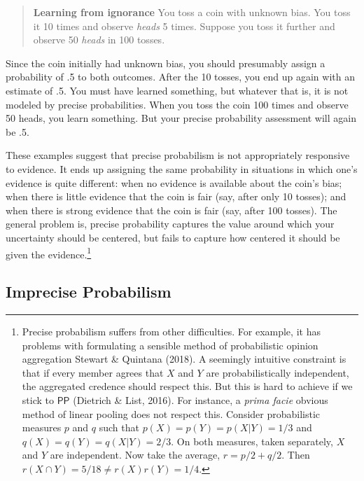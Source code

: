 \documentclass[
  10pt,
  dvipsnames,enabledeprecatedfontcommands]{scrartcl}
\newcommand{\s}[1]{\mbox{$\mathsf{#1}$}}
\begin{document}
\begin{quote}
\textbf{Learning from ignorance}
You toss a coin with unknown bias. You toss it 10 times and observe \emph{heads} 5 times. Suppose you toss it further and observe 50 \emph{heads} in 100 tosses. 
\end{quote}

\noindent Since the coin initially had unknown bias, you should
presumably assign a probability of .5 to both outcomes. After the 10
tosses, you end up again with an estimate of .5. You must have learned
something, but whatever that is, it is not modeled by precise
probabilities. When you toss the coin 100 times and observe 50 heads,
you learn something. But your precise probability assessment will again
be .5.

These examples suggest that precise probabilism is not appropriately
responsive to evidence. It ends up assigning the same probability in
situations in which one's evidence is quite different: when no evidence
is available about the coin's bias; when there is little evidence that
the coin is fair (say, after only 10 tosses); and when there is strong
evidence that the coin is fair (say, after 100 tosses). The general
problem is, precise probability captures the value around which your
uncertainty should be centered, but fails to capture how centered it
should be given the evidence.\footnote{Precise probabilism suffers from
  other difficulties. For example, it has problems with formulating a
  sensible method of probabilistic opinion aggregation Stewart \&
  Quintana (2018). A seemingly intuitive constraint is that if every
  member agrees that \(X\) and \(Y\) are probabilistically independent,
  the aggregated credence should respect this. But this is hard to
  achieve if we stick to \s{PP} (Dietrich \& List, 2016). For instance,
  a \emph{prima facie} obvious method of linear pooling does not respect
  this. Consider probabilistic measures \(p\) and \(q\) such that
  \(p(X) = p(Y) = p(X\vert Y) = 1/3\) and
  \(q(X) = q(Y) = q(X\vert Y) = 2/3\). On both measures, taken
  separately, \(X\) and \(Y\) are independent. Now take the average,
  \(r=p/2+q/2\). Then \(r(X\cap Y) = 5/18 \neq r(X)r(Y)=1/4\).}

\hypertarget{imprecise-probabilism}{%
\subsection{Imprecise Probabilism}\label{imprecise-probabilism}}
\end{document}
